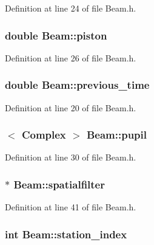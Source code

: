 Definition at line 24 of file Beam.h.

\hypertarget{classBeam_a342991126e87a3a2aa89d04ff7b2fd0a}{
\subsubsection[{piston}]{\setlength{\rightskip}{0pt plus 5cm}double {\bf Beam::piston}}}
\label{classBeam_a342991126e87a3a2aa89d04ff7b2fd0a}


Definition at line 26 of file Beam.h.

\hypertarget{classBeam_ac1e58da3860afeb2d8d6e1daf7022cca}{
\subsubsection[{previous\_\-time}]{\setlength{\rightskip}{0pt plus 5cm}double {\bf Beam::previous\_\-time}}}
\label{classBeam_ac1e58da3860afeb2d8d6e1daf7022cca}


Definition at line 20 of file Beam.h.

\hypertarget{classBeam_a3b248c45a5630e6e0761b1f2d16350fc}{
\subsubsection[{pupil}]{$<$ {\bf Complex} $>$ {\bf Beam::pupil}}}
\label{classBeam_a3b248c45a5630e6e0761b1f2d16350fc}


Definition at line 30 of file Beam.h.

\hypertarget{classBeam_a68bc1a7abd201297114cd53af925f83f}{
\subsubsection[{spatialfilter}]{$\ast$ {\bf Beam::spatialfilter}}}
\label{classBeam_a68bc1a7abd201297114cd53af925f83f}


Definition at line 41 of file Beam.h.

\hypertarget{classBeam_ae589b08d6d0d638c18a15880efc521d2}{
\subsubsection[{station\_\-index}]{\setlength{\rightskip}{0pt plus 5cm}int {\bf Beam::station\_\-index}}}
\label{classBeam_ae589b08d6d0d638c18a15880efc521d2}


